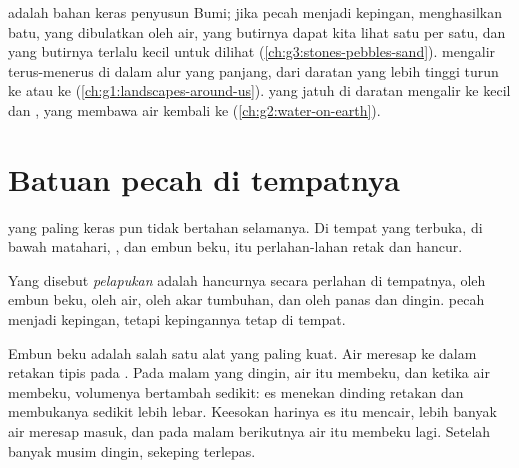 \begin{recall}
 adalah bahan keras penyusun Bumi; jika pecah menjadi kepingan, 
menghasilkan batu,  yang dibulatkan oleh air,  yang butirnya
dapat kita lihat satu per satu, dan  yang butirnya terlalu kecil untuk
dilihat (\cref{ch:g3:stones-pebbles-sand}).  mengalir terus-menerus di
dalam alur yang panjang, dari daratan yang lebih tinggi turun ke  atau
ke  (\cref{ch:g1:landscapes-around-us}).  yang jatuh di daratan
mengalir ke  kecil dan , yang membawa air kembali ke 
(\cref{ch:g2:water-on-earth}).
\end{recall}

\section{Batuan pecah di tempatnya}

 yang paling keras pun tidak bertahan selamanya. Di tempat yang
terbuka, di bawah matahari, , dan embun beku,  itu perlahan-lahan
retak dan hancur.

\begin{definition}[Pelapukan]\label{def:g5:water-shapes-the-land:weathering}
Yang disebut \emph{pelapukan} adalah hancurnya  secara
perlahan di tempatnya, oleh embun beku, oleh air, oleh akar tumbuhan, dan
oleh panas dan dingin.  pecah menjadi kepingan, tetapi kepingannya
tetap di tempat.
\end{definition}

Embun beku adalah salah satu alat  yang paling kuat. Air 
meresap ke dalam retakan tipis pada . Pada malam yang dingin, air itu
membeku, dan ketika air membeku, volumenya bertambah sedikit: es menekan
dinding retakan dan membukanya sedikit lebih lebar. Keesokan harinya es itu
mencair, lebih banyak air meresap masuk, dan pada malam berikutnya air itu
membeku lagi. Setelah banyak musim dingin, sekeping  terlepas.

